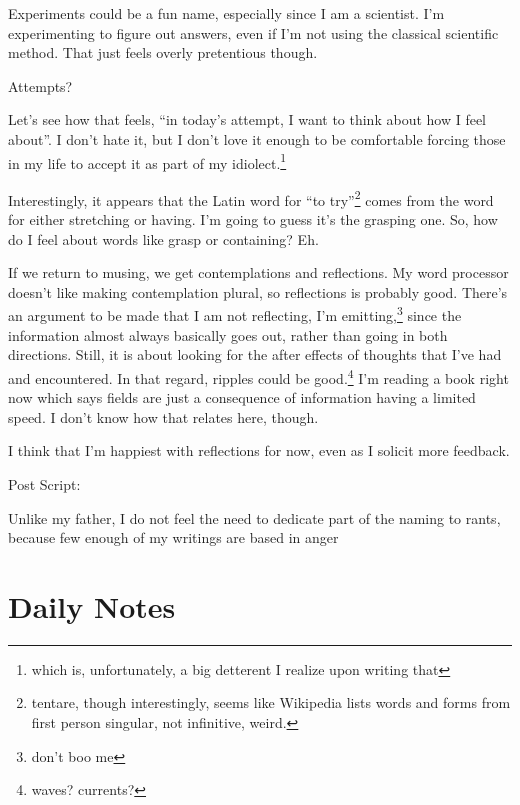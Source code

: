 \documentclass[12pt]{article}
\newcommand{\say}[1]{``#1''}
\renewcommand{\,}{\textsuperscript{,}}
\begin{document}
Experiments could be a fun name, especially since I am a scientist.  
I'm experimenting to figure out answers, even if I'm not using the classical scientific method.  
That just feels overly pretentious though.

Attempts?  
  
Let's see how that feels, \say{in today's attempt, I want to think about how I feel about}.  
I don't hate it, but I don't love it enough to be comfortable forcing those in my life to accept it as part of my idiolect.\footnote{which is, unfortunately, a big detterent I realize upon writing that}

Interestingly, it appears that the Latin word for \say{to try}\footnote{tentare, though interestingly, seems like Wikipedia lists words and forms from first person singular, not infinitive, weird.} comes from the word for either stretching or having.  
I'm going to guess it's the grasping one.  
So, how do I feel about words like grasp or containing?  
Eh.

If we return to musing, we get contemplations and reflections.  
My word processor doesn't like making contemplation plural, so reflections is probably good.  
There's an argument to be made that I am not reflecting, I'm emitting,\footnote{don't boo me} since the information almost always basically goes out, rather than going in both directions.  
Still, it is about looking for the after effects of thoughts that I've had and encountered.  
In that regard, ripples could be good.\footnote{waves? currents?}  
I'm reading a book right now which says fields are just a consequence of information having a limited speed.  
I don't know how that relates here, though.

I think that I'm happiest with reflections for now, even as I solicit more feedback.

Post Script:

Unlike my father, I do not feel the need to dedicate part of the naming to rants, because few enough of my writings are based in anger

\section{Daily Notes}
\end{document}
